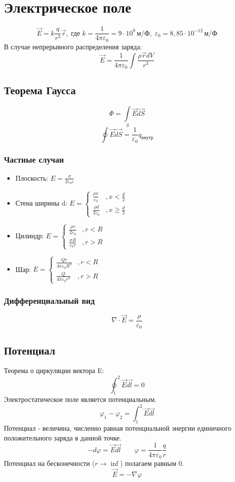 \documentclass{article}
\begin{document}
\tableofcontents

\section{Электрическое поле}
\[
    \vec{E} = k\frac{q}{r^3}\vec{r} ,\;\text{где }
    k=\frac{1}{4\pi\varepsilon_0}=9\cdot10^9 \,\text{м/Ф} ,\;
    \varepsilon_{0} = 8,85\cdot10^{-12} \,\text{м/Ф}
\]
В случае непрерывного распределения заряда:
\[\vec{E} = \frac{1}{4\pi\varepsilon_0}\int\frac{\rho\vec{r}dV}{r^3}\]

\subsection{Теорема Гаусса}
\[\Phi=\int\limits_{S}\vec{E}\vec{dS}\]
\[\oint\vec{E}\vec{dS}=\frac{1}{\varepsilon_{0}}q_\text{внутр}\]
\subsubsection{Частные случаи}
\begin{itemize}
    \item Плоскость: $E=\frac{\sigma}{2\varepsilon_{0}\varepsilon}$
    \item Стена ширины d: $E=\begin{cases}
                  \frac{\rho x}{\varepsilon_{0}}   & ,x<\frac{d}{2}   \\
                  \frac{\rho d}{2\varepsilon_{0}} & ,x\ge\frac{d}{2}
              \end{cases}$
    \item Цилиндр: $E=\begin{cases}
        \frac{\rho r}{2 \varepsilon_0} & ,r<R \\
        \frac{\sigma R}{\varepsilon_0 r} & ,r>R
    \end{cases}$
    \item Шар: $E=\begin{cases}
                  \frac{Qr}{4\pi\varepsilon_{0}R^3}  & ,r<R \\
                  \frac{Q}{4\pi\varepsilon_{0}r^{2}} & ,r>R
              \end{cases}$
\end{itemize}
\subsubsection{Дифференциальный вид}
\[\nabla\cdot\vec{E}=\frac{\rho}{\varepsilon_{0}}\]

\subsection{Потенциал}
Теорема о циркуляции вектора E:
\[\oint_{1}^{2}\vec{E}\vec{dl}=0\]
Электростатическое поле является потенциальным.
\[\varphi_{1}-\varphi_{2}=\int_{1}^{2}\vec{E}\vec{dl}\]
Потенциал - величина, численно равная потенциальной энергии единичного положительного заряда в данной точке.
\[
    -d\varphi=\vec{E}\vec{dl} \qquad
    \varphi=\frac{1}{4\pi\varepsilon_{0}}\frac{q}{r}
\]
Потенциал на бесконечности ($r\to\inf$) полагаем равным 0.
\[\vec{E}=-\nabla\varphi\]
\end{document}
